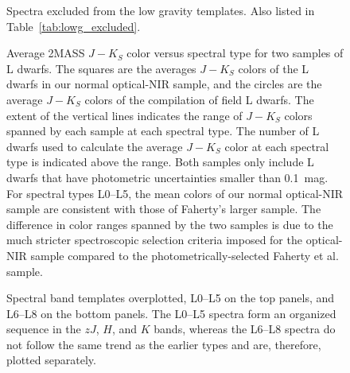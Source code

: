 \documentclass[12pt,preprint]{aastex}
\begin{document}
\begin{figure}
	\caption{Spectra excluded from the low gravity templates. Also listed in Table~\ref{tab:lowg_excluded}.}
	\label{fig:lowg_excluded}
\end{figure}


\begin{figure}
		\caption{Average 2MASS $J-K_S$ color versus spectral type for two samples of L dwarfs. The squares are the averages $J-K_S$ colors of the L dwarfs in our normal optical-NIR sample, and the circles are the average $J-K_S$ colors of the \citet{Faherty13_0355} compilation of field L dwarfs. The extent of the vertical lines indicates the range of $J-K_S$ colors spanned by each sample at each spectral type. The number of L dwarfs used to calculate the average $J-K_S$ color at each spectral type is indicated above the range. Both samples only include L dwarfs that have photometric uncertainties smaller than 0.1~mag. For spectral types L0--L5, the mean colors of our normal optical-NIR sample are consistent with those of Faherty's larger sample. The difference in color ranges spanned by the two samples is due to the much stricter spectroscopic selection criteria imposed for the optical-NIR sample compared to the photometrically-selected Faherty et al. sample. 
}
	\label{fig:JK_colors_F13}
\end{figure}


\begin{figure}
	\caption{Spectral band templates overplotted, L0--L5 on the top panels, and L6--L8 on the bottom panels. %
	The L0--L5 spectra form an organized sequence in the $zJ$, $H$, and $K$ bands, whereas the L6--L8 spectra do not follow the same trend as the earlier types and are, therefore, plotted separately.}
	\label{fig:spec_sequence}
\end{figure}
\end{document}
